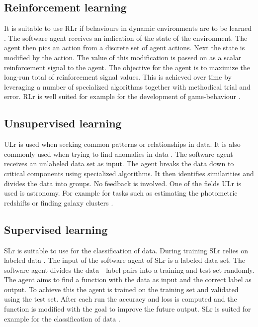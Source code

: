 \subsection{Reinforcement learning} \label{reinforcementLearning}
It is suitable to use RLr if behaviours in dynamic environments are to be learned \cite{reinforcementLearningIntroduction}. The software agent receives an indication of the state of the environment. The agent then pics an action from a discrete set of agent actions. Next the state is modified by the action. The value of this modification is passed on as a scalar reinforcement signal to the agent. The objective for the agent is to maximize the long-run total of reinforcement signal values. This is achieved over time by leveraging a number of specialized algorithms together with methodical trial and error. RLr is well suited for example for the development of game-behaviour \cite{reinforcementLearningGames}.

\subsection{Unsupervised learning} \label{unsupervisedLearning}
 ULr is used when seeking common patterns or relationships in data. It is also commonly used when trying to find anomalies in data \cite{unsupervisedLearningIntroduction}. The software agent receives an unlabeled data set as input. The agent breaks the data down to critical components using specialized algorithms. It then identifies similarities and divides the data into groups. No feedback is involved. One of the fields ULr is used is astronomy. For example for tasks such as estimating the photometric  redshifts or finding galaxy clusters \cite{unsuperviseLEarningAstronomy}. 

\subsection{Supervised learning} \label{supervisedLearning}
SLr is suitable to use for the classification of data. During training SLr relies on labeled data \cite{machineLeraningApproaches}. The input of the software agent of SLr is a labeled data set. The software agent divides the data---label pairs into a training and test set randomly. The agent aims to find a function with the data as input and the correct label as output. To achieve this the agent is trained on the training set and validated using the test set. After each run the accuracy and loss is computed and the function is modified with the goal to improve the future output. SLr is suited for example for the classification of data \cite{supervisedLearningClassification}. 

